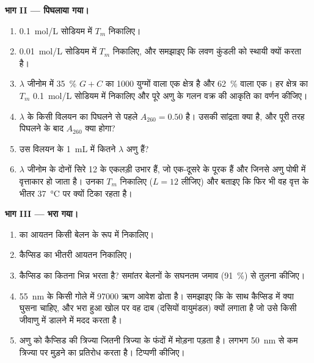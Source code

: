 \begin{problem}
\medskip
\noindent\textbf{भाग II --- पिघलाया गया।}
\begin{enumerate}[resume]
  \item \qty{0.1}{mol/L} सोडियम में $T_m$ निकालिए।
  \item \qty{0.01}{mol/L} सोडियम में $T_m$ निकालिए, और समझाइए कि लवण
        कुंडली को स्थायी क्यों करता है।
  \item $\lambda$ जीनोम में \qty{35}{\%} $G + C$ का \qty{1000}{}
        युग्मों वाला एक क्षेत्र है और \qty{62}{\%} वाला एक। हर क्षेत्र
        का $T_m$ \qty{0.1}{mol/L} सोडियम में निकालिए और पूरे अणु के गलन
        वक्र की आकृति का वर्णन कीजिए।
  \item $\lambda$  के किसी विलयन का पिघलने से पहले $A_{260} = 0.50$
        है। उसकी सांद्रता क्या है, और पूरी तरह पिघलने के बाद $A_{260}$
        क्या होगा?
  \item उस विलयन के \qty{1}{mL} में कितने $\lambda$ अणु हैं?
  \item $\lambda$ जीनोम के दोनों सिरे 12  के एकलड़ी
        उभार हैं, जो एक-दूसरे के पूरक हैं और जिनसे अणु पोषी में
        वृत्ताकार हो जाता है। उनका $T_m$ निकालिए ($L = 12$ लीजिए) और
        बताइए कि फिर भी वह वृत्त  के भीतर \qty{37}{\celsius} पर
        क्यों टिका रहता है।
\end{enumerate}

\medskip
\noindent\textbf{भाग III --- भरा गया।}
\begin{enumerate}[resume]
  \item {} का आयतन किसी बेलन के रूप में निकालिए।
  \item कैप्सिड का भीतरी आयतन निकालिए।
  \item {} कैप्सिड का कितना भिन्न भरता है? समांतर बेलनों के सघनतम
        जमाव (\qty{91}{\%}) से तुलना कीजिए।
  \item {} \qty{55}{nm} के किसी गोले में \num{97000} ऋण आवेश ढोता है।
        समझाइए कि  के साथ कैप्सिड में क्या घुसना चाहिए, और भरा हुआ
         खोल पर वह दाब (दसियों वायुमंडल) क्यों लगाता है जो उसे किसी
        जीवाणु में डालने में मदद करता है।
  \item अणु को कैप्सिड की त्रिज्या जितनी त्रिज्या के फंदों में मोड़ना
        पड़ता है।  लगभग \qty{50}{nm} से कम त्रिज्या पर मुड़ने का
        प्रतिरोध करता है। टिप्पणी कीजिए।
\end{enumerate}


\end{problem}
